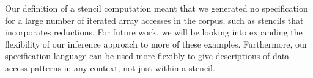 \documentclass[9pt]{sigplanconf}
\theoremstyle{definition}
\begin{document}
Our definition of a stencil computation meant that we generated no
specification for a large number of iterated array accesses in the
corpus, such as stencils that incorporates reductions. For
future work, we will be looking into expanding the flexibility of 
our inference approach to more of these examples. Furthermore, our specification
language can be used more flexibly to give descriptions of data access
patterns in any context, not just within a stencil.


\end{document}
